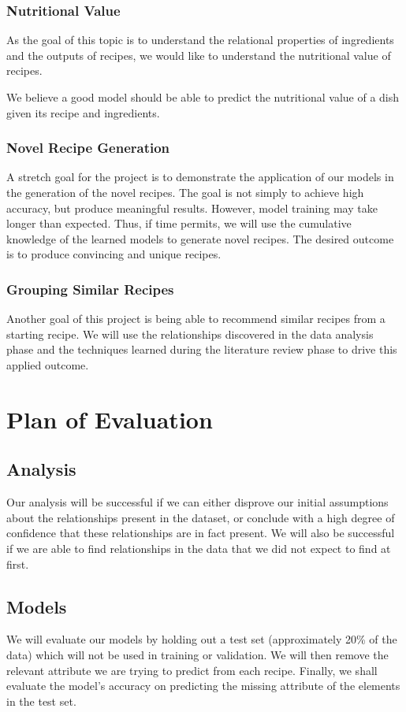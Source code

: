 \documentclass[sigconf]{acmart}
\begin{document}
\subsubsection{Nutritional Value}
As the goal of this topic is to understand the relational properties of ingredients and the outputs of recipes, we would like to understand the nutritional value of recipes.

We believe a good model should be able to predict the nutritional value of a dish given its recipe and ingredients.

\subsubsection{Novel Recipe Generation}
A stretch goal for the project is to demonstrate the application of our models in the generation of the novel recipes. The goal is not simply to achieve high accuracy, but produce meaningful results. However, model training may take longer than expected. Thus, if time permits, we will use the cumulative knowledge of the learned models to generate novel recipes. The desired outcome is to produce convincing and unique recipes.

\subsubsection{Grouping Similar Recipes}
Another goal of this project is being able to recommend similar recipes from a starting recipe. We will use the relationships discovered in the data analysis phase and the techniques learned during the literature review phase to drive this applied outcome.


\section{Plan of Evaluation}
\subsection{Analysis}
Our analysis will be successful if we can either disprove our initial assumptions about the relationships present in the dataset, or conclude with a high degree of confidence that these relationships are in fact present. We will also be successful if we are able to find relationships in the data that we did not expect to find at first.

\subsection{Models}
We will evaluate our models by holding out a test set (approximately 20\% of the data) which will not be used in training or validation. We will then remove the relevant attribute we are trying to predict from each recipe. Finally, we shall evaluate the model's accuracy on predicting the missing attribute of the elements in the test set.
\end{document}
